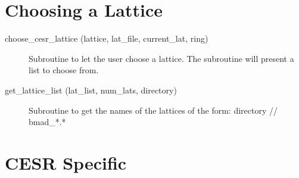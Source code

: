 \section{Choosing a Lattice}
\label{r:lat}

\begin{description}

\item[choose\_cesr\_lattice (lattice, lat\_file, current\_lat, ring)] \Newline
Subroutine to let the user choose a lattice. The subroutine will present a list to choose from. 

\item[get\_lattice\_list (lat\_list, num\_lats, directory)] \Newline
Subroutine to get the names of the lattices of the form: directory // bmad\_*.* 

\end{description}

\section{CESR Specific}
\label{r:cesr}

